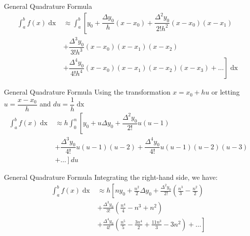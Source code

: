 \documentclass{beamer}
\begin{document}
\begin{frame}{General Quadrature Formula \cite{general_quadrature}}
      \begin{equation*}
        \begin{aligned}
          \int_{a}^{b} f(x) \mathop{dx} &\approx \int_a^b \left[ y_0 + \dfrac{\Delta y_0}{h}\left(x - x_0\right) + \dfrac{\Delta^2 y_0}{2!h^2}\left(x - x_0\right)\left(x - x_1\right) \right. \\ 
          &+ \dfrac{\Delta^3 y_0}{3!h^3}\left(x - x_0\right)\left(x - x_1\right)\left(x - x_2\right) \\
          &+ \left. \dfrac{\Delta^4 y_0}{4!h^4}\left(x - x_0\right)\left(x - x_1\right)\left(x - x_2\right)\left(x - x_3\right) + \dots \right] \mathop{dx}
        \end{aligned}
      \end{equation*}
\end{frame}

\begin{frame}{General Quadrature Formula \cite{general_quadrature}}
  Using the transformation $x = x_0 + hu$ or letting $u = \dfrac{x - x_0}{h}$ and $du = \dfrac{1}{h} \mathop{dx}$
      \begin{equation*}
        \begin{aligned}
          \int_{a}^{b} f(x) \mathop{dx} &\approx h \int_0^n \left[ y_0 + u\Delta y_0 + \dfrac{\Delta^2 y_0}{2!} u\left(u - 1\right) \right. \\
          &+ \dfrac{\Delta^3 y_0}{4!} u\left(u - 1\right)\left(u - 2\right) + \dfrac{\Delta^4 y_0}{4!} u\left(u - 1\right)\left(u - 2\right)\left(u - 3\right) \\
          & + \left. \dots \right] du
        \end{aligned}
      \end{equation*}
\end{frame}

\begin{frame}{General Quadrature Formula \cite{general_quadrature}}
  Integrating the right-hand side, we have:
      \begin{equation*}
        \begin{split}
          \int_{a}^{b} f(x) \mathop{dx} &\approx h\left[ny_0 + \frac{n^2}{2}\Delta y_0 + \frac{\Delta^2 y_0}{2!}\left(\frac{n^3}{3} - \frac{n^2}{2}\right) \right. \\
          &+ \frac{\Delta^3 y_0}{3!}\left(\frac{n^4}{4} - n^3 + n^2\right) \\ 
          &+ \left. \frac{\Delta^4 y_0}{4!}\left(\frac{n^5}{5} - \frac{3n^4}{2} + \frac{11n^3}{3} - 3n^2\right) + \dots \right]
        \end{split}
      \end{equation*}
\end{frame}
\end{document}

